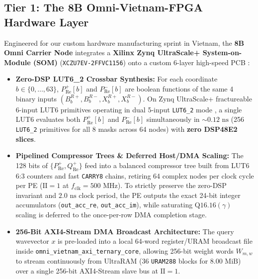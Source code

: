 \documentclass[10pt, twocolumn, a4paper]{article}
\begin{document}
\subsection{Tier 1: The 8B Omni-Vietnam-FPGA Hardware Layer}
Engineered for our custom hardware manufacturing sprint in Vietnam, the \textbf{8B Omni Carrier Node} integrates a \textbf{Xilinx Zynq UltraScale+ System-on-Module (SOM)} (\texttt{XCZU7EV-2FFVC1156}) onto a custom 6-layer high-speed PCB \cite{lodri2026omni}:
\begin{itemize}
    \item \textbf{Zero-DSP LUT6\_2 Crossbar Synthesis:} For each coordinate $b \in \{0, \dots, 63\}$, $P_{\text{Re}}^+[b]$ and $P_{\text{Re}}^-[b]$ are boolean functions of the same 4 binary inputs $(B_b^{R+}, B_b^{R-}, X_b^{R+}, X_b^{R-})$. On Zynq UltraScale+ fractureable 6-input LUT6 primitives operating in dual 5-input \texttt{LUT6\_2} mode \cite{umuroglu2017finn, wang2019lutnet}, a single LUT6 evaluates both $P_{\text{Re}}^+[b]$ and $P_{\text{Re}}^-[b]$ simultaneously in $\sim 0.12\text{ ns}$ (256 \texttt{LUT6\_2} primitives for all 8 masks across 64 nodes) with \textbf{zero DSP48E2 slices}.
    \item \textbf{Pipelined Compressor Trees \& Deferred Host/DMA Scaling:} The 128 bits of $\{P_{\text{Re}}^+, Q_{\text{Re}}^+\}$ feed into a balanced compressor tree built from LUT6 6:3 counters and fast \texttt{CARRY8} chains, retiring 64 complex nodes per clock cycle per PE ($\text{II}=1$ at $f_{\text{clk}} = 500\text{ MHz}$). To strictly preserve the zero-DSP invariant and $2.0\text{ ns}$ clock period, the PE outputs the exact 24-bit integer accumulators (\texttt{out\_acc\_re}, \texttt{out\_acc\_im}), while saturating $\text{Q16.16}(\gamma)$ scaling is deferred to the once-per-row DMA completion stage.
    \item \textbf{256-Bit AXI4-Stream DMA Broadcast Architecture:} The query wavevector $x$ is pre-loaded into a local 64-word register/URAM broadcast file inside \texttt{omni\_vietnam\_axi\_ternary\_core}, allowing 256-bit weight words $W_{m,w}$ to stream continuously from UltraRAM (36 \texttt{URAM288} blocks for $8.00\text{ MiB}$) over a single 256-bit AXI4-Stream slave bus at $\text{II}=1$.
\end{itemize}
\end{document}
